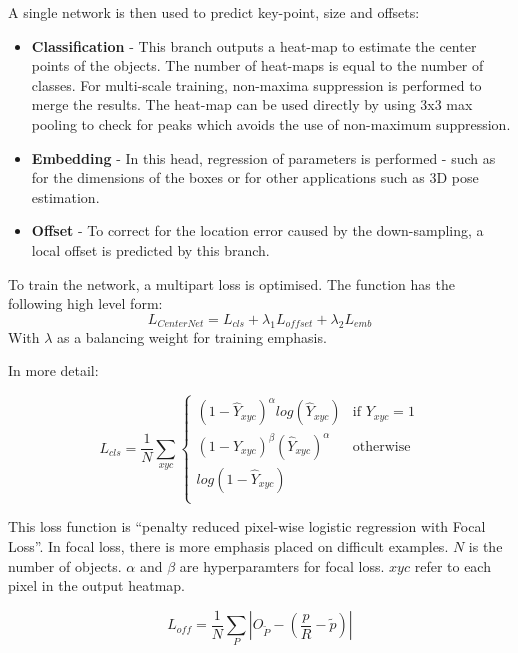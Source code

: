 \documentclass[a4paper,twoside,12pt]{report}
\begin{document}
A single network is then used to predict key-point, size and offsets: 
\begin{itemize}
    \setlength\itemsep{0em}
    \item \textbf{Classification} - This branch outputs a heat-map to estimate the center points of the objects. The number of heat-maps is equal to the number of classes. For multi-scale training, non-maxima suppression is performed to merge the results. The heat-map can be used directly by using 3x3 max pooling to check for peaks which avoids the use of non-maximum suppression. 
    
    \item \textbf{Embedding} - In this head, regression of parameters is performed - such as for the dimensions of the boxes or for other applications such as 3D pose estimation.
    
    \item \textbf{Offset} - To correct for the location error caused by the down-sampling, a local offset is predicted by this branch.
\end{itemize}

To train the network, a multipart loss is optimised. The function has the following high level form:
\begin{equation}
L_{CenterNet} =  L_{cls} + \lambda_1 L_{offset} + \lambda_2 L_{emb} 
\end{equation} 
With $\lambda$ as a balancing weight for training emphasis. 

In more detail:

\begin{equation}
L_{cls} =  \frac{1}{N} \sum_{xyc}
    \begin{cases}
      (1-\hat{Y}_{xyc})^{\alpha}log(\hat{Y}_{xyc}) & \text{if $Y_{xyc}=1$}\\
      (1-Y_{xyc})^{\beta}(\hat{Y}_{xyc})^{\alpha} & \text{otherwise}\\
      log(1-\hat{Y}_{xyc})\\
    \end{cases} 
\end{equation}

This loss function is ``penalty reduced pixel-wise logistic regression with Focal Loss''. In focal loss, there is more emphasis placed on difficult examples. $N$ is the number of objects. $\alpha$ and $\beta$ are hyperparamters for focal loss. $xyc$ refer to each pixel in the output heatmap.

\begin{equation}
L_{off} =  \frac{1}{N} \sum_{P} |\hat{O}_{\tilde{P}}-(\frac{p}{R}-\tilde{p})|
\end{equation}
\end{document}
